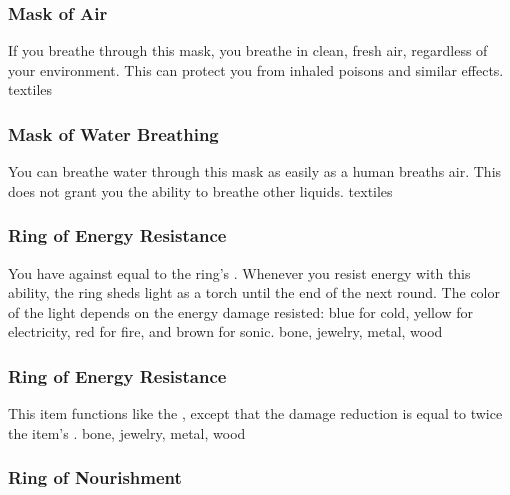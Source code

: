 \hypertarget{item:Mask of Air}{\subsubsection{Mask of Air\hfill{}}}
If you breathe through this mask, you breathe in clean, fresh air, regardless of your environment.
This can protect you from inhaled poisons and similar effects.
 
 textiles
\lowercase{\hypertarget{item:Mask of Water Breathing}{}}\label{item:Mask of Water Breathing}
\hypertarget{item:Mask of Water Breathing}{\subsubsection{Mask of Water Breathing\hfill{}}}
You can breathe water through this mask as easily as a human breaths air.
This does not grant you the ability to breathe other liquids.
 
 textiles
\lowercase{\hypertarget{item:Ring of Energy Resistance}{}}\label{item:Ring of Energy Resistance}
\hypertarget{item:Ring of Energy Resistance}{\subsubsection{Ring of Energy Resistance\hfill{}}}
You have  against  equal to the ring's .
Whenever you resist energy with this ability, the ring sheds light as a torch until the end of the next round.
The color of the light depends on the energy damage resisted: blue for cold, yellow for electricity, red for fire, and brown for sonic.
 
 bone, jewelry, metal, wood
\lowercase{\hypertarget{item:Ring of Energy Resistance}{}}\label{item:Ring of Energy Resistance}
\hypertarget{item:Ring of Energy Resistance}{\subsubsection{Ring of Energy Resistance\hfill{}}}
This item functions like the , except that the damage reduction is equal to twice the item's .
 
 bone, jewelry, metal, wood
\lowercase{\hypertarget{item:Ring of Nourishment}{}}\label{item:Ring of Nourishment}
\hypertarget{item:Ring of Nourishment}{\subsubsection{Ring of Nourishment\hfill{}}}
